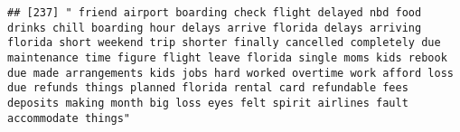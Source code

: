 \documentclass[
]{article}
\begin{document}
\begin{verbatim}
## [237] " friend airport boarding check flight delayed nbd food drinks chill boarding hour delays arrive florida delays arriving florida short weekend trip shorter finally cancelled completely due maintenance time figure flight leave florida single moms kids rebook due made arrangements kids jobs hard worked overtime work afford loss due refunds things planned florida rental card refundable fees deposits making month big loss eyes felt spirit airlines fault accommodate things"                                                                                                                                                                                                                                                                                                                                                                                                                                                                                                                                                                                                                                                                                                                                                                                                                                                                                                                                                                                                                                                                                                                                                                                                                                                                                                       

\end{verbatim}
\end{document}
